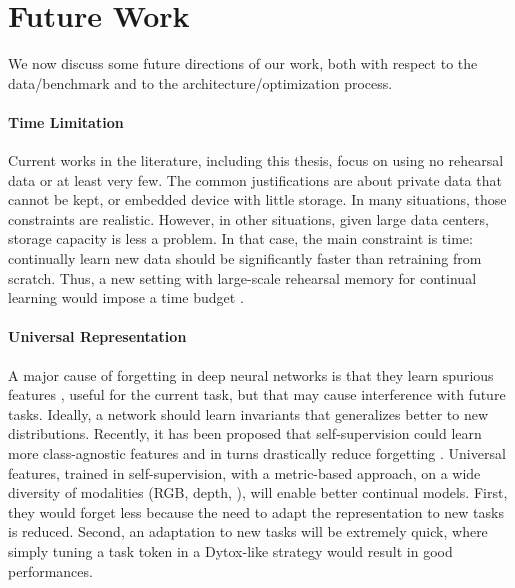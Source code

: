 \section{Future Work}

We now discuss some future directions of our work, both with respect to the data/benchmark and to
the architecture/optimization process.

\vspace{2em}

\paragraph{Time Limitation} Current works in the literature, including this thesis, focus on using
no rehearsal data or at least very few. The common justifications are about private data that cannot
be kept, or embedded device with little storage. In many situations, those constraints are
realistic. However, in other situations, given large data centers, storage capacity is less a
problem. In that case, the main constraint is time: continually learn new data should be
significantly faster than retraining from scratch. Thus, a new setting with large-scale rehearsal
memory for continual learning would impose a time budget \citep{veniat2018budgetedlearning}.

\paragraph{Universal Representation} A major cause of forgetting in deep neural networks is that
they learn spurious features \citep{lesort2022spuriousfeatures}, useful for the current task, but
that may cause interference with future tasks. Ideally, a network should learn invariants
\citep{arjovsky2019irm,rame2021fishr} that generalizes better to new distributions. Recently, it has
been proposed that self-supervision could learn more class-agnostic features and in turns
drastically reduce forgetting \citep{gallardo2021selfsupcontinual}. Universal
features, trained in self-supervision, with a metric-based approach, on a wide diversity of
modalities (RGB, depth, \etc), will enable better continual models. First, they would forget less
because the need to adapt the representation to new tasks is reduced. Second, an adaptation to new
tasks will be extremely quick, where simply tuning a task token in a Dytox-like strategy would
result in good performances.

\vspace{2em}

